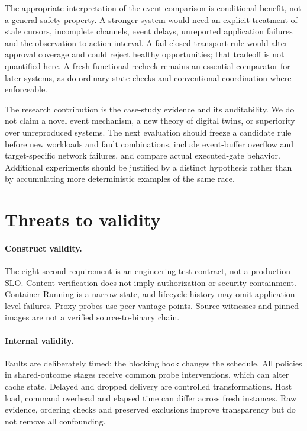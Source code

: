\documentclass[manuscript,review,nonacm]{acmart}
\begin{document}
The appropriate interpretation of the event comparison is conditional benefit, not a general safety property. A stronger system would need an explicit treatment of stale cursors, incomplete channels, event delays, unreported application failures and the observation-to-action interval. A fail-closed transport rule would alter approval coverage and could reject healthy opportunities; that tradeoff is not quantified here. A fresh functional recheck remains an essential comparator for later systems, as do ordinary state checks and conventional coordination where enforceable.

The research contribution is the case-study evidence and its auditability. We do not claim a novel event mechanism, a new theory of digital twins, or superiority over unreproduced systems. The next evaluation should freeze a candidate rule before new workloads and fault combinations, include event-buffer overflow and target-specific network failures, and compare actual executed-gate behavior. Additional experiments should be justified by a distinct hypothesis rather than by accumulating more deterministic examples of the same race.

\section{Threats to validity}
\paragraph{Construct validity.} The eight-second requirement is an engineering test contract, not a production SLO. Content verification does not imply authorization or security containment. Container Running is a narrow state, and lifecycle history may omit application-level failures. Proxy probes use peer vantage points. Source witnesses and pinned images are not a verified source-to-binary chain.

\paragraph{Internal validity.} Faults are deliberately timed; the blocking hook changes the schedule. All policies in shared-outcome stages receive common probe interventions, which can alter cache state. Delayed and dropped delivery are controlled transformations. Host load, command overhead and elapsed time can differ across fresh instances. Raw evidence, ordering checks and preserved exclusions improve transparency but do not remove all confounding.
\end{document}
